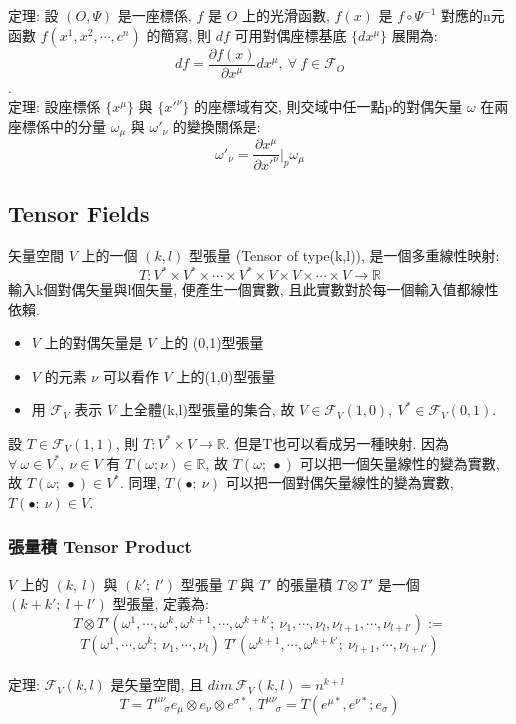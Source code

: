 \documentclass{article}
\begin{document}
\begin{CJK}{UTF8}{bsmi}
定理: 設 $(O,\Psi)$ 是一座標係, $f$ 是 $O$ 上的光滑函數, $f(x)$ 是 $f\circ \Psi^{-1}$ 對應的n元函數 $f(x^1, x^2, \cdots, c^n)$ 的簡寫, 則 $df$ 可用對偶座標基底 $\{ dx^\mu\}$ 展開為: $$df=\frac{\partial f(x)}{\partial x^\mu}dx^\mu,\ \forall\ f\in \mathscr{F}_O $$.
\\

定理: 設座標係 $\{ x^\mu\}$ 與 $\{ x'^\nu\}$ 的座標域有交, 則交域中任一點p的對偶矢量 $\omega$ 在兩座標係中的分量 $\omega_\mu$ 與 $\omega'_\nu$ 的變換關係是: $$\omega'_\nu=\frac{\partial x^\mu}{\partial x'^\nu}|_p \omega_\mu $$
\subsection{Tensor Fields}
矢量空間 $V$ 上的一個 $(k,l)$ 型張量 (Tensor of type(k,l)), 是一個多重線性映射:$$T:V^*\times V^*\times\cdots\times V^* \times V\times V\times \cdots \times V\rightarrow \mathbb{R} $$
輸入k個對偶矢量與l個矢量, 便產生一個實數, 且此實數對於每一個輸入值都線性依賴.
\begin{itemize}
  \item $V$ 上的對偶矢量是 $V$ 上的 (0,1)型張量
  \item $V$ 的元素 $\nu$ 可以看作 $V$ 上的(1,0)型張量
  \item 用 $\mathscr{F}_V$ 表示 $V$ 上全體(k,l)型張量的集合, 故 $V\in\mathscr{F}_V(1,0),\ V^*\in \mathscr{F}_V(0,1).$
\end{itemize}
 設 $T\in \mathscr{F}_V(1,1)$, 則 $T: V^* \times V\rightarrow \mathbb{R}$. 但是T也可以看成另一種映射. 因為 $\forall\ \omega \in V^*,\ \nu\in V$ 有 $T(\omega;\nu)\in\mathbb{R}$, 故 $T(\omega;\ \bullet)$ 可以把一個矢量線性的變為實數, 故 $T(\omega;\ \bullet)\in V^*$. 同理, $T(\bullet;\ \nu)$ 可以把一個對偶矢量線性的變為實數, $T(\bullet;\ \nu)\in V$.
\subsubsection{張量積 Tensor Product}
$V$ 上的 $(k,\ l)$ 與 $(k';\ l')$ 型張量 $T$ 與 $T'$ 的張量積 $T\otimes T'$ 是一個 $(k+k';\ l+l')$ 型張量, 定義為: $$T\otimes T'(\omega^1,\cdots, \omega^k,\omega^{k+1}, \cdots,\omega^{k+k'};\ \nu_1, \cdots, \nu_l,\nu_{l+1},\cdots,\nu_{l+l'} ) := $$$$ T(\omega^1,\cdots,\omega^k;\ \nu_1,\cdots,\nu_l) \ T'(\omega^{k+1},\cdots,\omega^{k+k'};\ \nu_{l+1},\cdots,\nu_{l+l'})$$
\\

定理: $\mathscr{F}_V(k,l)$ 是矢量空間, 且 $dim\ \mathscr{F}_V(k,l)=n^{k+l}$ $$T=T^{\mu\nu}_ {\quad{\sigma} }e_\mu \otimes e_\nu \otimes e^{\sigma*}, \ T^{\mu\nu}_ {\quad{\sigma} }=T(e^{\mu *},e^{\nu*};e_\sigma)$$

\end{CJK}
\end{document}
